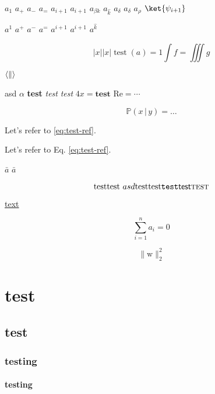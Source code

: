 \documentclass{minimal}
\begin{document}
$a_1$
$a_+$
$a_-$
$a_=$
$a_{i + 1}$
$a_{i+1}$
$a_{\beta k}$
$a_{\hat k}$
$a_{\delta}$
$a_\delta$
$a_\rho$
$\ket{\psi_{i+1}}$

$a^1$
$a^+$
$a^-$
$a^=$
$a^{i + 1}$
$a^{i+1}$
$a^{\hat k}$

\begin{equation}
  \lvert x \rvert
  \bigl\lvert x \bigr\rvert
  \operatorname{test}(a) = 1
  \int f = \iiint g
\end{equation}

$\langle \| \\ \rangle$

\textup{asd $\alpha$}
\textbf{test}
\textit{test}
\textsl{test}
$4 \mathit{x} = \mathbf{test}$
$\mathrm{Re} = \cdots$

\begin{equation}
  \mathbb{P}(x \,|\, y) \!= \dots
  \label{eq:test-ref}
\end{equation}

Let's refer to \eqref{eq:test-ref}.

Let's refer to Eq. \ref{eq:test-ref}.

$\bar a$
$\bar{a}$

\begin{equation}
  \text{test}
  \textnormal{test $asd$}
  \textrm{test}
  \textup{test}
  \texttt{test}
  \textsf{test}
  \textsc{test}
\end{equation}

\href{url}{text}


\begin{equation}
  \sum_{i=1}^n a_i = 0
\end{equation}

$$\lVert \mathrm{w} \rVert_2^2$$

\chapter{test}

\section{test}

\subsection{testing}

\subsubsection{testing}
\end{document}
